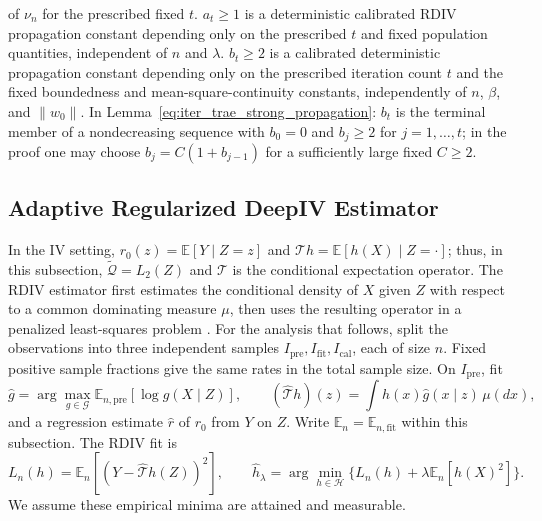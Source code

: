\documentclass[12pt]{article}
\theoremstyle{plain}
\theoremstyle{definition}
\theoremstyle{remark}
\begin{document}
of $\nu_n$ for the prescribed fixed $t$. $a_t\geqslant1$ is a deterministic calibrated RDIV propagation constant depending only on the prescribed $t$ and fixed population quantities, independent of $n$ and $\lambda$. $b_t\geqslant2$ is a calibrated deterministic propagation constant depending only on the prescribed iteration count $t$ and the fixed boundedness and mean-square-continuity constants, independently of $n$, $\beta$, and $\|w_0\|$. In Lemma~\ref{eq:iter_trae_strong_propagation}: $b_t$ is the terminal member of a nondecreasing sequence with $b_0=0$ and $b_j\geqslant2$ for $j=1,\ldots,t$; in the proof one may choose $b_j=C(1+b_{j-1})$ for a sufficiently large fixed $C\geqslant2$.





\subsection{Adaptive Regularized DeepIV Estimator}\label{sec:rdiv}

In the IV setting, $r_0(z)=\mathbb E[Y\mid Z=z]$ and $\mathcal T h=\mathbb E[h(X)\mid Z=\cdot]$; thus, in this subsection, $\tilde{\mathcal Q}=L_2(Z)$ and $\mathcal T$ is the conditional expectation operator. The RDIV estimator first estimates the conditional density of $X$ given $Z$ with respect to a common dominating measure $\mu$, then uses the resulting operator in a penalized least-squares problem \citep{li2024regularized}. For the analysis that follows, split the observations into three independent samples $I_{\mathrm{pre}},I_{\mathrm{fit}},I_{\mathrm{cal}}$, each of size $n$. Fixed positive sample fractions give the same rates in the total sample size. On $I_{\mathrm{pre}}$, fit
\[
\hat g=\arg\max_{g\in\mathcal G}\mathbb E_{n,\mathrm{pre}}[\log g(X\mid Z)],
\qquad
(\hat{\mathcal T}h)(z)=\int h(x)\hat g(x\mid z)\,\mu(dx),
\]
and a regression estimate $\hat r$ of $r_0$ from $Y$ on $Z$. Write $\mathbb E_n=\mathbb E_{n,\mathrm{fit}}$ within this subsection. The RDIV fit is
\[
L_n(h)=\mathbb E_n[(Y-\hat{\mathcal T}h(Z))^2],
\qquad
\hat h_\lambda=\arg\min_{h\in\mathcal H}\{L_n(h)+\lambda\mathbb E_n[h(X)^2]\}.
\]
We assume these empirical minima are attained and measurable.
\end{document}
